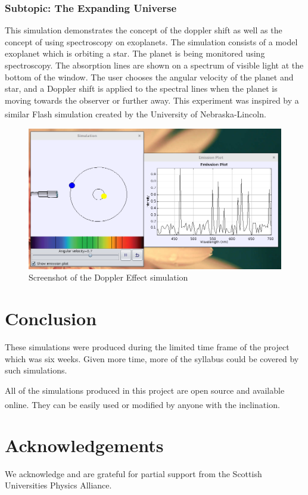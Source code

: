 \documentclass[11pt]{article}
\begin{document}
\subsubsection*{Subtopic: The Expanding Universe}
This simulation demonstrates the concept of the doppler shift as well
as the concept of using spectroscopy on exoplanets. The simulation
consists of a model exoplanet which is orbiting a star. The planet is
being monitored using spectroscopy. The absorption lines are shown on
a spectrum of visible light at the bottom of the window. The user
chooses the angular velocity of the planet and star, and a Doppler
shift is applied to the spectral lines when the planet is moving
towards the observer or further away. This experiment was inspired by
a similar Flash simulation created by the University of Nebraska-Lincoln\textsuperscript{\cite{doppler}}.
\begin{figure}[H]
\centering
\includegraphics[width=.9\linewidth]{./dopplerUI.png}
\caption{Screenshot of the Doppler Effect simulation}
\end{figure}

\section*{Conclusion}
These simulations were produced during the limited time frame of the
project which was six weeks. Given more time, more of the
syllabus could be covered by such simulations.

All of the simulations produced in this project are open source and
available online\textsuperscript{\cite{repo}}. They can be easily used
or modified by anyone with the inclination.

\section*{Acknowledgements}
We acknowledge and are grateful for partial support from the Scottish Universities Physics Alliance.
\end{document}

